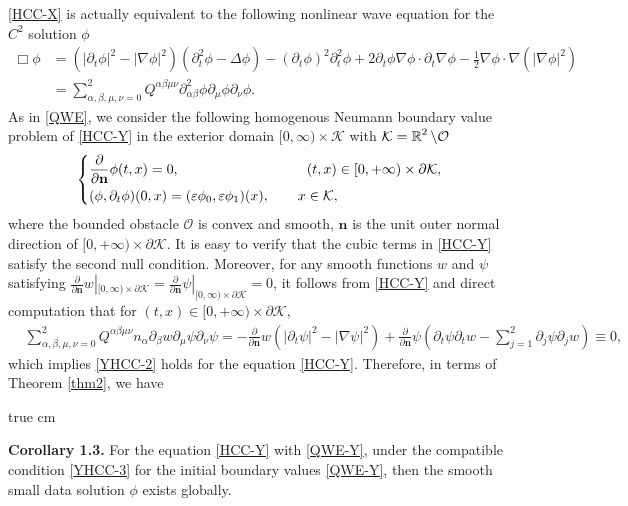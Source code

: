 \documentclass[11pt,twoside]{article}
\def\cK{\mathcal K}
\def\cO{\mathcal O}
\def\R{\mathop{\mathbb R\kern 0pt}\nolimits}
\def\f{\frac}
\def\p{\partial}
\def\ve{\varepsilon}
\def\bn{\mathbf{n}}
\theoremstyle{plain}
\theoremstyle{definition}
\numberwithin{equation}{section}
\begin{document}
\eqref{HCC-X} is actually equivalent to the following nonlinear wave equation for the $C^2$ solution $\phi$
\begin{equation}\label{HCC-Y}
\begin{split}
\Box\phi&=(|\p_t\phi|^2-|\nabla\phi|^2)(\p_t^2\phi-\Delta\phi)
-(\p_t\phi)^2\p_t^2\phi+2\p_t\phi\nabla\phi\cdot\p_t\nabla\phi-\f12\nabla\phi\cdot\nabla(|\nabla\phi|^2)\\
&=\sum_{\alpha,\beta,\mu,\nu=0}^2Q^{\alpha\beta\mu\nu}\p^2_{\alpha\beta}\phi\p_{\mu}\phi\p_{\nu}\phi.
\end{split}
\end{equation}
As in \eqref{QWE}, we consider the following homogenous Neumann boundary value problem of \eqref{HCC-Y} in the exterior domain
$[0,\infty)\times\cK$ with $\cK=\R^2\setminus\cO$
\begin{equation}\label{QWE-Y}
\left\{
\begin{aligned}
&\frac{\p}{\p\bn}\phi(t,x)=0,\hspace{3.2cm} (t,x)\in[0,+\infty)\times\p\cK,\\
&(\phi,\p_t\phi)(0,x)=(\ve \phi_0,\ve \phi_1)(x),\qquad x\in\cK,
\end{aligned}
\right.
\end{equation}
where the bounded obstacle $\cO$ is convex and smooth, $\bn$ is the unit outer normal direction of $[0,+\infty)\times \p\cK$.
It is easy to verify that the cubic terms in \eqref{HCC-Y} satisfy the second null condition. Moreover,
for any smooth functions
$w$ and $\psi$ satisfying $\f{\p}{\p\bn}w|_{[0,\infty)\times\p\cK}=\f{\p}{\p\bn}\psi|_{[0,\infty)\times\p\cK}
=0$, it follows from \eqref{HCC-Y} and direct computation that for $(t,x)\in[0,+\infty)\times\p\cK$,
\begin{equation}\label{YHHC-0111}
\begin{split}
&\sum_{\alpha,\beta,\mu,\nu=0}^2Q^{\alpha\beta\mu\nu}n_{\alpha}\p_{\beta}w\p_{\mu}\psi\p_{\nu}\psi
=-\f{\p}{\p\bn}w(|\p_t\psi|^2-|\nabla\psi|^2)+\f{\p}{\p\bn}\psi(\p_t\psi\p_tw-\sum_{j=1}^2\p_j\psi\p_jw)\equiv0,
\end{split}
\end{equation}
which implies \eqref{YHCC-2} holds for the equation \eqref{HCC-Y}.
Therefore, in terms of Theorem \ref{thm2}, we have

 true cm

{\bf Corollary 1.3.} For the equation \eqref{HCC-Y} with \eqref{QWE-Y}, under the compatible condition \eqref{YHCC-3}
for the initial boundary values \eqref{QWE-Y},
then the smooth small data solution $\phi$ exists globally.
\end{document}
